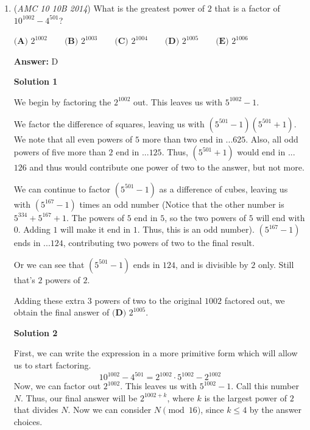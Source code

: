 \begin{enumerate}
 
Multiplying these together, the probability for the second case is $\frac{5}{6^3}.$ However, there are $\frac{4!}{3!\cdot{1!}} = 4$ ways to arrange $AAAB$, so we must multiply by a factor of 4 to get the true probability for this case, which is $4(\frac{5}{6^3}) = \frac{20}{6^3}.$

 
Adding these two cases, we get the requested probability: $\frac{1+20}{6^3} = \frac{21}{216} = \frac{7}{72},$ or answer choice $\boxed{\textbf{(B)}}$

 
-Benedict T (countmath1)

 


	\item (\textit{AMC 10 10B 2014}) What is the greatest power of $2$ that is a factor of $10^{1002} - 4^{501}$?


 $\textbf{(A) } 2^{1002} \qquad\textbf{(B) } 2^{1003} \qquad\textbf{(C) } 2^{1004} \qquad\textbf{(D) } 2^{1005} \qquad\textbf{(E) }2^{1006}$

 \textbf{Answer: }D



\textbf{Solution 1}

We begin by factoring the $2^{1002}$ out. This leaves us with $5^{1002} - 1$. 

 We factor the difference of squares, leaving us with $(5^{501} - 1)(5^{501} + 1)$. We note that all even powers of $5$ more than two end in ...$625$. Also, all odd powers of five more than $2$ end in  ...$125$. Thus, $(5^{501} + 1)$ would end in ...$126$ and thus would contribute one power of two to the answer, but not more. 

 We can continue to factor $(5^{501} - 1)$ as a difference of cubes, leaving us with $(5^{167} - 1)$ times an odd number (Notice that the other number is $5^{334} + 5^{167} + 1$. The powers of $5$ end in $5$, so the two powers of $5$ will end with $0$. Adding $1$ will make it end in $1$. Thus, this is an odd number). $(5^{167} - 1)$ ends in ...$124$, contributing two powers of two to the final result.

 Or we can see that $(5^{501} - 1)$ ends in $124$, and is divisible by $2$ only. Still that's $2$ powers of $2$.

 Adding these extra $3$ powers of two to the original $1002$ factored out, we obtain the final answer of $\textbf{(D) } 2^{1005}$.

 



\textbf{Solution 2}

First, we can write the expression in a more primitive form which will allow us to start factoring.
 \[10^{1002} - 4^{501} = 2^{1002} \cdot 5^{1002} - 2^{1002}\]Now, we can factor out $2^{1002}$. This leaves us with $5^{1002} - 1$. Call this number $N$. Thus, our final answer will be $2^{1002+k}$, where $k$ is the largest power of $2$ that divides $N$. Now we can consider $N \pmod{16}$, since $k \le 4$ by the answer choices. 


\end{enumerate}
